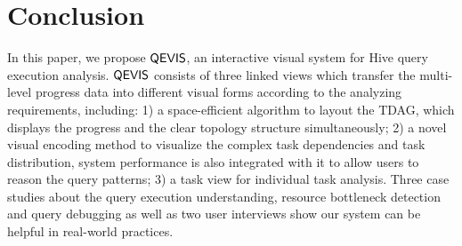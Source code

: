 \section{Conclusion}
In this paper, we propose $\mathsf{QEVIS}$, an interactive visual system for Hive query execution analysis. 
$\mathsf{QEVIS}$ consists of three linked views which transfer the multi-level progress data into different visual forms according to the analyzing requirements, including:
1) a space-efficient algorithm to layout the TDAG, which displays the progress and the clear topology structure simultaneously; 
2) a novel visual encoding method to visualize the complex task dependencies and task distribution, system performance is also integrated with it to allow users to reason the query patterns; 
3) a task view for individual task analysis. Three case studies about the query execution understanding, resource bottleneck detection and query debugging as well as two user interviews show our system can be helpful in real-world practices.
